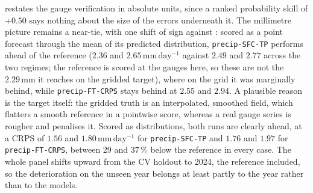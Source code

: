  restates the gauge verification in absolute units, since a ranked
probability skill of $+0.50$ says nothing about the size of the errors underneath it. The millimetre
picture remains a near-tie, with one shift of sign against :
scored as a point forecast through the mean of its predicted distribution, \texttt{precip-SFC-TP} performs ahead of the reference ($2.36$ and $2.65\,\mathrm{mm\,day^{-1}}$ against $2.49$ and
$2.77$ across the two regimes; the reference is scored at the gauges here, so these are not the
$2.29\,\mathrm{mm}$ it reaches on the gridded target), where on the grid it was marginally behind, while
\texttt{precip-FT-CRPS} stays behind at $2.55$ and $2.94$. A plausible reason is the target itself:
the gridded truth is an interpolated, smoothed field, which flatters a smooth reference in a
pointwise score, whereas a real gauge series is rougher and penalises it. Scored as distributions, both runs are clearly ahead, at a CRPS of
$1.56$ and $1.80\,\mathrm{mm\,day^{-1}}$ for \texttt{precip-SFC-TP} and $1.76$ and $1.97$ for
\texttt{precip-FT-CRPS}, between $29$ and $37\,\%$ below the reference in every case. The whole
panel shifts upward from the CV holdout to 2024, the reference included, so the deterioration on the
unseen year belongs at least partly to the year rather than to the models.
